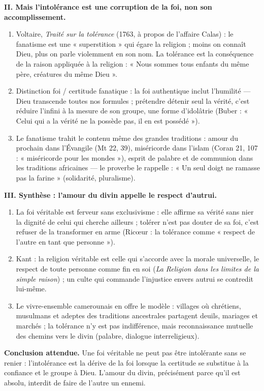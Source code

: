 \documentclass[11pt]{article}
\begin{document}
\begin{corrige}
\textbf{II. Mais l'intolérance est une corruption de la foi, non son accomplissement.}
\begin{enumerate}
\item Voltaire, \emph{Traité sur la tolérance} (1763, à propos de l'affaire Calas) : le fanatisme est une « superstition » qui égare la religion ; moins on connaît Dieu, plus on parle violemment en son nom. La tolérance est la conséquence de la raison appliquée à la religion : « Nous sommes tous enfants du même père, créatures du même Dieu ».
\item Distinction foi / certitude fanatique : la foi authentique inclut l'humilité — Dieu transcende toutes nos formules ; prétendre détenir seul la vérité, c'est réduire l'infini à la mesure de son groupe, une forme d'idolâtrie (Buber : « Celui qui a la vérité ne la possède pas, il en est possédé »).
\item Le fanatisme trahit le contenu même des grandes traditions : amour du prochain dans l'Évangile (Mt 22, 39), miséricorde dans l'islam (Coran 21, 107 : « miséricorde pour les mondes »), esprit de palabre et de communion dans les traditions africaines — le proverbe le rappelle : « Un seul doigt ne ramasse pas la farine » (solidarité, pluralisme).
\end{enumerate}

\textbf{III. Synthèse : l'amour du divin appelle le respect d'autrui.}
\begin{enumerate}
\item La foi véritable est ferveur sans exclusivisme : elle affirme sa vérité sans nier la dignité de celui qui cherche ailleurs ; tolérer n'est pas douter de sa foi, c'est refuser de la transformer en arme (Ricœur : la tolérance comme « respect de l'autre en tant que personne »).
\item Kant : la religion véritable est celle qui s'accorde avec la morale universelle, le respect de toute personne comme fin en soi (\emph{La Religion dans les limites de la simple raison}) ; un culte qui commande l'injustice envers autrui se contredit lui-même.
\item Le vivre-ensemble camerounais en offre le modèle : villages où chrétiens, musulmans et adeptes des traditions ancestrales partagent deuils, mariages et marchés ; la tolérance n'y est pas indifférence, mais reconnaissance mutuelle des chemins vers le divin (palabre, dialogue interreligieux).
\end{enumerate}

\textbf{Conclusion attendue.} Une foi véritable ne peut pas être intolérante sans se renier : l'intolérance est la dérive de la foi lorsque la certitude se substitue à la confiance et le groupe à Dieu. L'amour du divin, précisément parce qu'il est absolu, interdit de faire de l'autre un ennemi.


\end{corrige}
\end{document}
